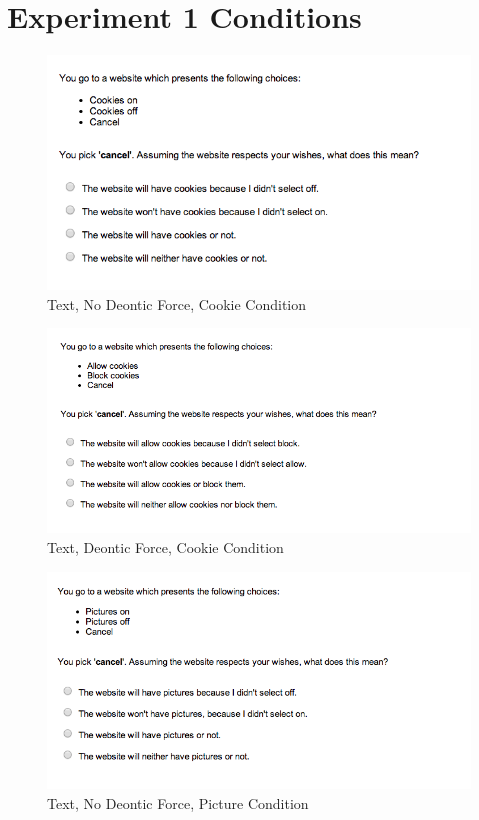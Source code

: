 
\chapter{Experiment 1 Conditions}
\label{exp1-conditions}
\begin{figure}[h!]
\centerline{
\includegraphics[scale=.5]{chapter5.tex/textnocpcookie}
}
\caption{Text, No Deontic Force, Cookie Condition}
\end{figure}


\begin{figure}[h!]
\centerline{
\includegraphics[scale=.5]{chapter5.tex/textcpcookie}
}
\caption{Text, Deontic Force, Cookie Condition}
\end{figure}


\begin{figure}[h!]
\centerline{
\includegraphics[scale=.5]{chapter5.tex/textnocppic}
}
\caption{Text, No Deontic Force, Picture Condition}
\end{figure}


